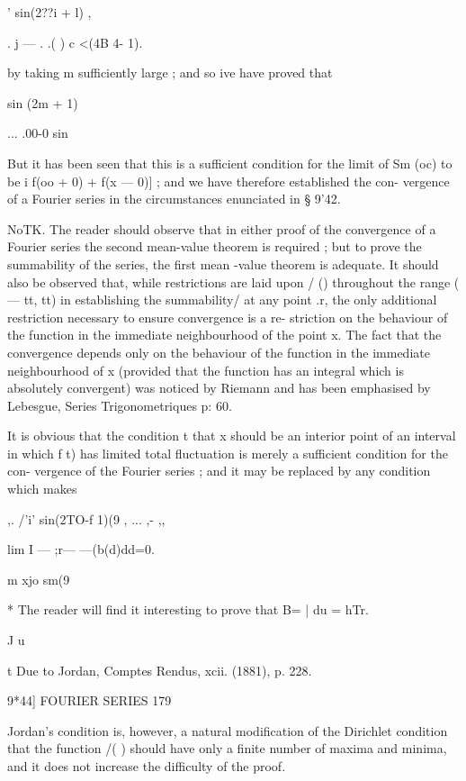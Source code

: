   ' sin(2??i + l)  , 

.  j  — . .( ) c  <(4B 4- 1). 

by taking m sufficiently large ; and so ive have proved that 

sin (2m + 1)  

... .00-0 sin 

But it has been seen that this is a sufficient condition for the limit of Sm (oc) 
to be i  f(oo + 0) + f(x — 0)] ; and we have therefore established the con- 
vergence of a Fourier series in the circumstances enunciated in § 9'42. 

NoTK. The reader should observe that in either proof of the convergence of a Fourier 
series the second mean-value theorem is required ; but to prove the summability of the 
series, the first mean -value theorem is adequate. It should also be observed that, while 
restrictions are laid upon / () throughout the range ( — tt, tt) in establishing the summability/ 
at any point .r, the only additional restriction necessary to ensure convergence is a re- 
striction on the behaviour of the function in the immediate neighbourhood of the point x. 
The fact that the convergence depends only on the behaviour of the function in the 
immediate neighbourhood of x (provided that the function has an integral which is 
absolutely convergent) was noticed by Riemann and has been emphasised by Lebesgue, 
Series Trigonometriques  p: 60. 

It is obvious that the condition t that x should be an interior point of an interval 
in which f t) has limited total fluctuation is merely a sufficient condition for the con- 
vergence of the Fourier series ; and it may be replaced by any condition which makes 

,. /'i'  sin(2TO-f 1)(9 , ... ,- ,, 

lim I   — ;r— —(b(d)dd=0. 

m xjo sm(9 

* The reader will find it interesting to prove that B= | du = hTr. 

J u 

t Due to Jordan, Comptes Rendus, xcii. (1881), p. 228. 



9*44] FOURIER SERIES 179 

Jordan's condition is, however, a natural modification of the Dirichlet condition that 
the function /( ) should have only a finite number of maxima and minima, and it does 
not increase the difficulty of the proof. 

